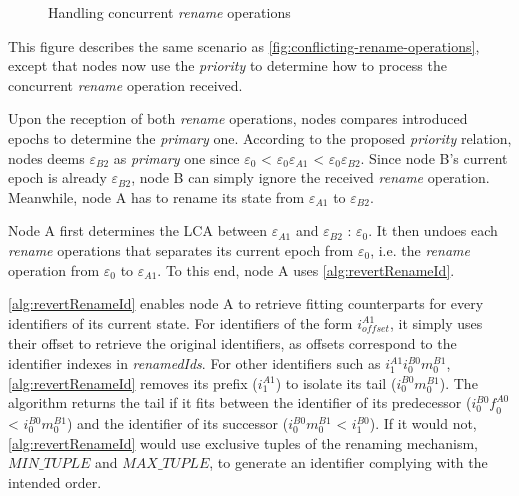 \documentclass[10pt,journal,compsoc]{IEEEtran}
\let\MYoriglatexcaption\caption
\renewcommand{\caption}[2][\relax]{\MYoriglatexcaption[#2]{#2}}
\newcommand{\ie}{i.e. }
\newcommand{\trm}[1]{\mathit{#1}}
\newcommand{\id}[3]{$\trm{#1}^{\trm{#2}}_{\trm{#3}}$}
\newcommand{\epoch}[1]{$\varepsilon_{#1}$}
\begin{document}
\begin{figure}[t!]
    \caption{Handling concurrent \emph{rename} operations}
    \label{fig:revertRenameId}
\end{figure}

This figure describes the same scenario as \autoref{fig:conflicting-rename-operations}, except that nodes now use the \emph{priority} to determine how to process the concurrent \emph{rename} operation received.

Upon the reception of both \emph{rename} operations, nodes compares introduced epochs to determine the \emph{primary} one.
According to the proposed \emph{priority} relation, nodes deems \epoch{B2} as \emph{primary} one since \epoch{0} < \epoch{0}\epoch{A1} < \epoch{0}\epoch{B2}.
Since node B's current epoch is already \epoch{B2}, node B can simply ignore the received \emph{rename} operation.
Meanwhile, node A has to rename its state from \epoch{A1} to \epoch{B2}.

Node A first determines the \ac{LCA} between \epoch{A1} and \epoch{B2} : \epoch{0}.
It then undoes each \emph{rename} operations that separates its current epoch from \epoch{0}, \ie the \emph{rename} operation from \epoch{0} to \epoch{A1}.
To this end, node A uses \autoref{alg:revertRenameId}.

\autoref{alg:revertRenameId} enables node A to retrieve fitting counterparts for every identifiers of its current state.
For identifiers of the form \id{i}{A1}{offset}, it simply uses their offset to retrieve the original identifiers, as offsets correspond to the identifier indexes in \emph{renamedIds}.
For other identifiers such as \id{i}{A1}{1}\id{i}{B0}{0}\id{m}{B1}{0}, \autoref{alg:revertRenameId} removes its prefix (\id{i}{A1}{1}) to isolate its tail (\id{i}{B0}{0}\id{m}{B1}{0}).
The algorithm returns the tail if it fits between the identifier of its predecessor (\id{i}{B0}{0}\id{f}{A0}{0} < \id{i}{B0}{0}\id{m}{B1}{0}) and the identifier of its successor (\id{i}{B0}{0}\id{m}{B1}{0} < \id{i}{B0}{1}).
If it would not, \autoref{alg:revertRenameId} would use exclusive tuples of the renaming mechanism, $\trm{MIN\_TUPLE}$ and $\trm{MAX\_TUPLE}$, to generate an identifier complying with the intended order.
\end{document}
